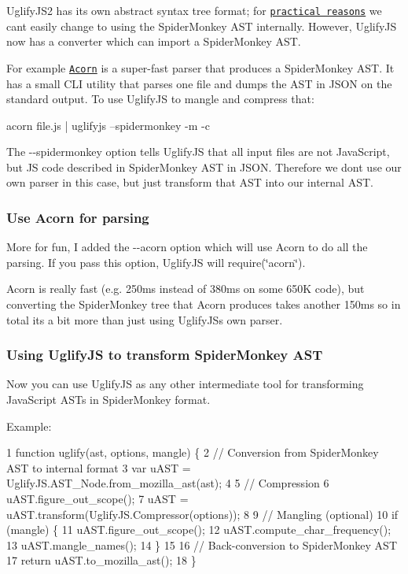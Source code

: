 Uglify\+J\+S2 has its own abstract syntax tree format; for \href{http://lisperator.net/blog/uglifyjs-why-not-switching-to-spidermonkey-ast/}{\tt practical reasons} we can\textquotesingle{}t easily change to using the Spider\+Monkey A\+S\+T internally. However, Uglify\+J\+S now has a converter which can import a Spider\+Monkey A\+S\+T.

For example \href{https://github.com/marijnh/acorn}{\tt Acorn} is a super-\/fast parser that produces a Spider\+Monkey A\+S\+T. It has a small C\+L\+I utility that parses one file and dumps the A\+S\+T in J\+S\+O\+N on the standard output. To use Uglify\+J\+S to mangle and compress that\+: \begin{DoxyVerb}acorn file.js | uglifyjs --spidermonkey -m -c
\end{DoxyVerb}


The {\ttfamily -\/-\/spidermonkey} option tells Uglify\+J\+S that all input files are not Java\+Script, but J\+S code described in Spider\+Monkey A\+S\+T in J\+S\+O\+N. Therefore we don\textquotesingle{}t use our own parser in this case, but just transform that A\+S\+T into our internal A\+S\+T.

\subsubsection*{Use Acorn for parsing}

More for fun, I added the {\ttfamily -\/-\/acorn} option which will use Acorn to do all the parsing. If you pass this option, Uglify\+J\+S will {\ttfamily require(\char`\"{}acorn\char`\"{})}.

Acorn is really fast (e.\+g. 250ms instead of 380ms on some 650\+K code), but converting the Spider\+Monkey tree that Acorn produces takes another 150ms so in total it\textquotesingle{}s a bit more than just using Uglify\+J\+S\textquotesingle{}s own parser.

\subsubsection*{Using Uglify\+J\+S to transform Spider\+Monkey A\+S\+T}

Now you can use Uglify\+J\+S as any other intermediate tool for transforming Java\+Script A\+S\+Ts in Spider\+Monkey format.

Example\+:


\begin{DoxyCode}
1 function uglify(ast, options, mangle) \{
2   // Conversion from SpiderMonkey AST to internal format
3   var uAST = UglifyJS.AST\_Node.from\_mozilla\_ast(ast);
4 
5   // Compression
6   uAST.figure\_out\_scope();
7   uAST = uAST.transform(UglifyJS.Compressor(options));
8 
9   // Mangling (optional)
10   if (mangle) \{
11     uAST.figure\_out\_scope();
12     uAST.compute\_char\_frequency();
13     uAST.mangle\_names();
14   \}
15 
16   // Back-conversion to SpiderMonkey AST
17   return uAST.to\_mozilla\_ast();
18 \}
\end{DoxyCode}


